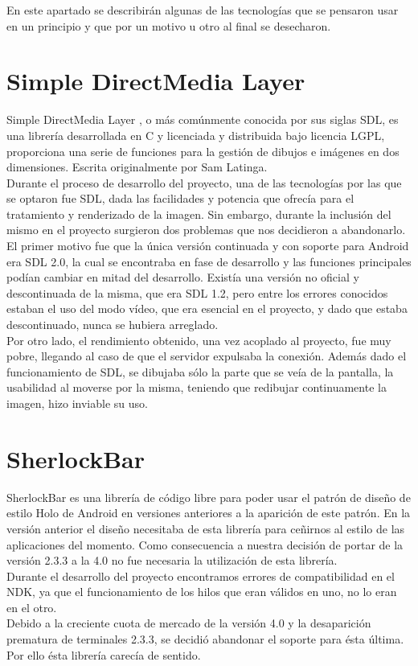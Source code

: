 En este apartado se describirán algunas de las tecnologías que se pensaron usar en un principio y que por un motivo u otro al final se desecharon.

\section{Simple DirectMedia Layer}

Simple DirectMedia Layer \cite{sdl:sdl}\cite{sdl2:sdl2}, o más comúnmente conocida por sus siglas SDL, es una librería desarrollada en C y licenciada y distribuida bajo licencia LGPL, proporciona una serie de funciones para la gestión de dibujos e imágenes en dos dimensiones. Escrita originalmente por Sam Latinga.\\

Durante el proceso de desarrollo del proyecto, una de las tecnologías por las que se optaron fue SDL, dada las facilidades y potencia que ofrecía para el tratamiento y renderizado de la imagen. Sin embargo, durante la inclusión del mismo en el proyecto surgieron dos problemas que nos decidieron a abandonarlo.\\

El primer motivo fue que la única versión continuada y con soporte para Android era SDL 2.0, la cual se encontraba en fase de desarrollo y las funciones principales podían cambiar en mitad del desarrollo. Existía una versión no oficial y descontinuada de la misma, que era SDL 1.2, pero entre los errores conocidos estaban el uso del modo vídeo, que era esencial en el proyecto, y dado que estaba descontinuado, nunca se hubiera arreglado.\\

Por otro lado, el rendimiento obtenido, una vez acoplado al proyecto, fue muy pobre, llegando al caso de que el servidor expulsaba la conexión. Además dado el funcionamiento de SDL, se dibujaba sólo la parte que se veía de la pantalla, la usabilidad al moverse por la misma, teniendo que redibujar continuamente la imagen, hizo inviable su uso.
\newpage
\section{SherlockBar}

SherlockBar\cite{sherlock:sherlock} es una librería de código libre para poder usar el patrón de diseño de estilo Holo de Android en versiones anteriores a la aparición de este patrón. En la versión anterior el diseño necesitaba de esta librería para ceñirnos al estilo de las aplicaciones del momento. Como consecuencia a nuestra decisión de portar de la versión 2.3.3 a la 4.0 no fue necesaria la utilización de esta librería.\\

Durante el desarrollo del proyecto encontramos errores de compatibilidad en el NDK, ya que el funcionamiento de los hilos que eran válidos en uno, no lo eran en el otro.\\

Debido a la creciente cuota de mercado de la versión 4.0 y la desaparición prematura de terminales 2.3.3, se decidió abandonar el soporte para ésta última. Por ello ésta librería carecía de sentido. 
